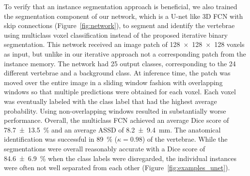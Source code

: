 \documentclass[authoryear,5p,final,times]{elsarticle}
\begin{document}
    To verify that an instance segmentation approach is beneficial, we also trained the segmentation component of our network, which is a U-net like 3D FCN with skip connections (Figure~\ref*{fig:network}), to segment and identify the vertebrae using multiclass voxel classification instead of the proposed iterative binary segmentation. This network received an image patch of \num{128x128x128} voxels as input, but unlike in our iterative approach not a corresponding patch from the instance memory. The network had \num{25} output classes, corresponding to the \num{24} different vertebrae and a background class. At inference time, the patch was moved over the entire image in a sliding window fashion with overlapping windows so that multiple predictions were obtained for each voxel. Each voxel was eventually labeled with the class label that had the highest average probability. Using non-overlapping windows resulted in substantially worse performance. Overall, the multiclass FCN achieved an average Dice score of \SI{78.7(135)}{\percent} and an average ASSD of \SI{8.2(94)}{\milli\meter}. The anatomical identification was successful in \SI{89}{\percent} ($\kappa = 0.98$) of the vertebrae. While the segmentations were overall reasonably accurate with a Dice score of \SI{84.6(69)}{\percent} when the class labels were disregarded, the individual instances were often not well separated from each other (Figure~\ref*{fig:examples_unet}).
\end{document}
